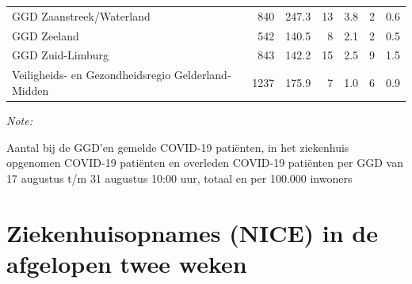 \documentclass[
  english,
  man,floatsintext]{apa6}
\begin{document}
\begin{table}
\begin{threeparttable}
\begin{tabular}{lrrrrrr}
GGD Zaanstreek/Waterland & 840 & 247.3 & 13 & 3.8 & 2 & 0.6\\
GGD Zeeland & 542 & 140.5 & 8 & 2.1 & 2 & 0.5\\
GGD Zuid-Limburg & 843 & 142.2 & 15 & 2.5 & 9 & 1.5\\
Veiligheids- en Gezondheidsregio Gelderland-Midden & 1237 & 175.9 & 7 & 1.0 & 6 & 0.9\\
\bottomrule
\end{tabular}
\begin{tablenotes}
\item \textit{Note: } 
\item Aantal bij de GGD’en gemelde COVID-19 patiënten, in het ziekenhuis opgenomen COVID-19 patiënten en overleden COVID-19 patiënten per GGD van 17 augustus t/m 31 augustus 10:00 uur, totaal en per 100.000 inwoners
\end{tablenotes}
\end{threeparttable}
\endgroup{}
\end{table}

\newpage

\hypertarget{ziekenhuisopnames-nice-in-de-afgelopen-twee-weken}{%
\section{Ziekenhuisopnames (NICE) in de afgelopen twee weken}\label{ziekenhuisopnames-nice-in-de-afgelopen-twee-weken}}
\end{document}
